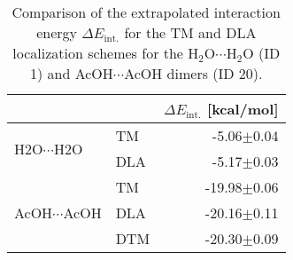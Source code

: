 \begin{table}
\caption{\label{tab:loc_scheme_test}Comparison of the extrapolated interaction energy $\Delta E_\text{int.}$ for the TM and DLA localization schemes for the H$_2$O$\cdots$H$_2$O (ID 1) and AcOH$\cdots$AcOH dimers (ID 20).}
\begin{adjustbox}{center}
\begin{tabular}{llr}
\toprule
 &  & $\Delta E_\text{int.}$ [kcal/mol] \\ 
\midrule
\multirow[t]{2}{*}{H2O$\cdots$H2O} & TM & -5.06$\pm$0.04 \\
 & DLA & -5.17$\pm$0.03 \\
\cline{1-3}
\multirow[t]{3}{*}{AcOH$\cdots$AcOH} & TM & -19.98$\pm$0.06 \\
 & DLA & -20.16$\pm$0.11 \\
 & DTM & -20.30$\pm$0.09 \\
\cline{1-3}
\bottomrule
\end{tabular}
\end{adjustbox}
\end{table}